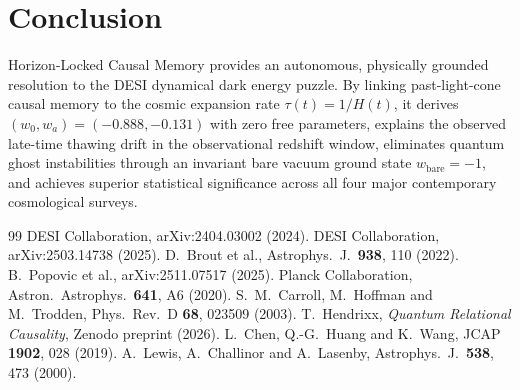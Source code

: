 \documentclass[10pt,twocolumn]{article}
\begin{document}
\section{Conclusion}
Horizon-Locked Causal Memory provides an autonomous, physically grounded resolution to the DESI dynamical dark energy puzzle. By linking past-light-cone causal memory to the cosmic expansion rate $\tau(t) = 1/H(t)$, it derives $(w_0, w_a) = (-0.888, -0.131)$ with zero free parameters, explains the observed late-time thawing drift in the observational redshift window, eliminates quantum ghost instabilities through an invariant bare vacuum ground state $w_{\mathrm{bare}} = -1$, and achieves superior statistical significance across all four major contemporary cosmological surveys.

\begin{thebibliography}{99}\footnotesize\setlength{\itemsep}{0pt}
 DESI Collaboration, arXiv:2404.03002 (2024).
 DESI Collaboration, arXiv:2503.14738 (2025).
 D.~Brout et al., Astrophys.\ J.\ \textbf{938}, 110 (2022).
 B.~Popovic et al., arXiv:2511.07517 (2025).
 Planck Collaboration, Astron.\ Astrophys.\ \textbf{641}, A6 (2020).
 S.~M.~Carroll, M.~Hoffman and M.~Trodden, Phys.\ Rev.\ D \textbf{68}, 023509 (2003).
 T.~Hendrixx, \emph{Quantum Relational Causality}, Zenodo preprint (2026).
 L.~Chen, Q.-G.~Huang and K.~Wang, JCAP \textbf{1902}, 028 (2019).
 A.~Lewis, A.~Challinor and A.~Lasenby, Astrophys.\ J.\ \textbf{538}, 473 (2000).
\end{thebibliography}
\end{document}
